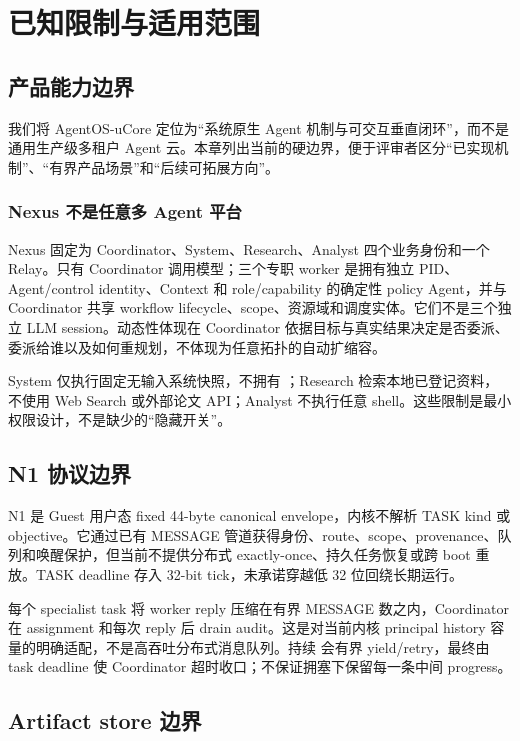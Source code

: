 \chapter{已知限制与适用范围}
\label{chap:limitations}

\section{产品能力边界}

我们将 AgentOS-uCore 定位为“系统原生 Agent 机制与可交互垂直闭环”，而不是通用生产级多租户 Agent 云。本章列出当前的硬边界，便于评审者区分“已实现机制”、“有界产品场景”和“后续可拓展方向”。

\subsection{Nexus 不是任意多 Agent 平台}

Nexus 固定为 Coordinator、System、Research、Analyst 四个业务身份和一个 Relay。只有 Coordinator 调用模型；三个专职 worker 是拥有独立 PID、Agent/control identity、Context 和 role/capability 的确定性 policy Agent，并与 Coordinator 共享 workflow lifecycle、scope、资源域和调度实体。它们不是三个独立 LLM session。动态性体现在 Coordinator 依据目标与真实结果决定是否委派、委派给谁以及如何重规划，不体现为任意拓扑的自动扩缩容。

System 仅执行固定无输入系统快照，不拥有 ；Research 检索本地已登记资料，不使用 Web Search 或外部论文 API；Analyst 不执行任意 shell。这些限制是最小权限设计，不是缺少的“隐藏开关”。

\section{N1 协议边界}

N1 是 Guest 用户态 fixed 44-byte canonical envelope，内核不解析 TASK kind 或 objective。它通过已有 MESSAGE 管道获得身份、route、scope、provenance、队列和唤醒保护，但当前不提供分布式 exactly-once、持久任务恢复或跨 boot 重放。TASK deadline 存入 32-bit tick，未承诺穿越低 32 位回绕长期运行。

每个 specialist task 将 worker reply 压缩在有界 MESSAGE 数之内，Coordinator 在 assignment 和每次 reply 后 drain audit。这是对当前内核 principal history 容量的明确适配，不是高吞吐分布式消息队列。持续  会有界 yield/retry，最终由 task deadline 使 Coordinator 超时收口；不保证拥塞下保留每一条中间 progress。

\section{Artifact store 边界}

